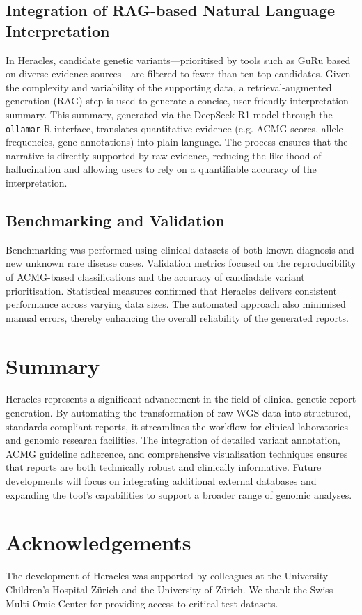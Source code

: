 \subsection{Integration of RAG-based Natural Language Interpretation}
\noindent
In Heracles, candidate genetic variants—prioritised by tools such as GuRu based on diverse evidence sources—are filtered to fewer than ten top candidates. Given the complexity and variability of the supporting data, a retrieval-augmented generation (RAG) step is used to generate a concise, user-friendly interpretation summary. This summary, generated via the DeepSeek-R1 model through the \texttt{ollamar} R interface, translates quantitative evidence (e.g. ACMG scores, allele frequencies, gene annotations) into plain language. The process ensures that the narrative is directly supported by raw evidence, reducing the likelihood of hallucination and allowing users to rely on a quantifiable accuracy of the interpretation.


\subsection{Benchmarking and Validation}
\noindent
Benchmarking was performed using  clinical datasets of both known diagnosis and new unknown rare disease cases. Validation metrics focused on the reproducibility of ACMG-based classifications and the accuracy of candiadate variant prioritisation. Statistical measures confirmed that Heracles delivers consistent performance across varying data sizes. The automated approach also minimised manual errors, thereby enhancing the overall reliability of the generated reports.

\section{Summary}
\noindent
Heracles represents a significant advancement in the field of clinical genetic report generation. By automating the transformation of raw WGS data into structured, standards-compliant reports, it streamlines the workflow for clinical laboratories and genomic research facilities. The integration of detailed variant annotation, ACMG guideline adherence, and comprehensive visualisation techniques ensures that reports are both technically robust and clinically informative. Future developments will focus on integrating additional external databases and expanding the tool’s capabilities to support a broader range of genomic analyses.

\section*{Acknowledgements}
\noindent
The development of Heracles was supported by colleagues at the University Children's Hospital Zürich and the University of Zürich. We thank the Swiss Multi-Omic Center for providing access to critical test datasets.

